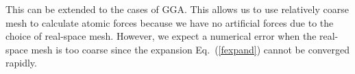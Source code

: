 \documentclass[twocolumn,showpacs,preprintnumbers,amsmath,amssymb,floatfix]{revtex4-1}
\newcommand{\bfr}{{\bf r}}
\newcommand{\bfG}{{\bf G}}
\newcommand{\req}[1]{\mbox{Eq.~\!(\ref{#1})}}
\begin{document}
This can be extended to the cases of GGA. 
This allows us to use relatively coarse mesh to calculate 
atomic forces because we have no artificial forces due to the choice 
of real-space mesh. However, we expect a numerical error when the real-space
mesh is too coarse since the expansion \req{fexpand} cannot be
converged rapidly.




\end{document}
